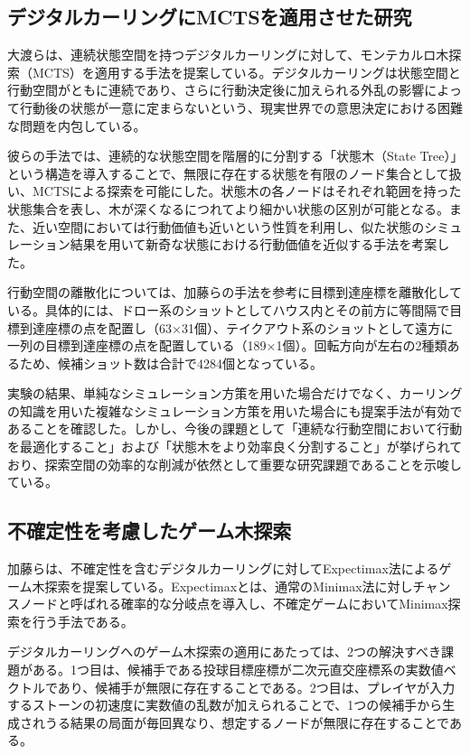 \documentclass[11pt,a4j]{jreport}
\begin{document}
\subsection{デジタルカーリングにMCTSを適用させた研究}
大渡ら\cite{owatari2016}は、連続状態空間を持つデジタルカーリングに対して、モンテカルロ木探索（MCTS）を適用する手法を提案している。デジタルカーリングは状態空間と行動空間がともに連続であり、さらに行動決定後に加えられる外乱の影響によって行動後の状態が一意に定まらないという、現実世界での意思決定における困難な問題を内包している。

彼らの手法では、連続的な状態空間を階層的に分割する「状態木（State Tree）」という構造を導入することで、無限に存在する状態を有限のノード集合として扱い、MCTSによる探索を可能にした。状態木の各ノードはそれぞれ範囲を持った状態集合を表し、木が深くなるにつれてより細かい状態の区別が可能となる。また、近い空間においては行動価値も近いという性質を利用し、似た状態のシミュレーション結果を用いて新奇な状態における行動価値を近似する手法を考案した。

行動空間の離散化については、加藤らの手法を参考に目標到達座標を離散化している。具体的には、ドロー系のショットとしてハウス内とその前方に等間隔で目標到達座標の点を配置し（63×31個）、テイクアウト系のショットとして遠方に一列の目標到達座標の点を配置している（189×1個）。回転方向が左右の2種類あるため、候補ショット数は合計で4284個となっている。

実験の結果、単純なシミュレーション方策を用いた場合だけでなく、カーリングの知識を用いた複雑なシミュレーション方策を用いた場合にも提案手法が有効であることを確認した。しかし、今後の課題として「連続な行動空間において行動を最適化すること」および「状態木をより効率良く分割すること」が挙げられており、探索空間の効率的な削減が依然として重要な研究課題であることを示唆している。

\subsection{不確定性を考慮したゲーム木探索}
加藤ら\cite{kato2016}は、不確定性を含むデジタルカーリングに対してExpectimax法によるゲーム木探索を提案している。Expectimaxとは、通常のMinimax法に対しチャンスノードと呼ばれる確率的な分岐点を導入し、不確定ゲームにおいてMinimax探索を行う手法である。

デジタルカーリングへのゲーム木探索の適用にあたっては、2つの解決すべき課題がある。1つ目は、候補手である投球目標座標が二次元直交座標系の実数値ベクトルであり、候補手が無限に存在することである。2つ目は、プレイヤが入力するストーンの初速度に実数値の乱数が加えられることで、1つの候補手から生成されうる結果の局面が毎回異なり、想定するノードが無限に存在することである。
\end{document}
